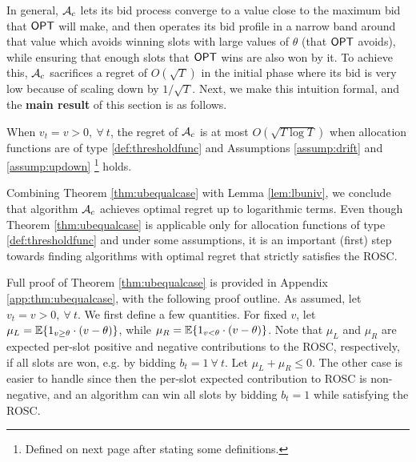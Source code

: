 In general, $\mathcal{A}_c$ lets its bid process converge to a value close to the maximum bid that $\mathsf{OPT}$ will make, and then operates its bid profile in a narrow band around that value which avoids winning slots with large values of $\theta$ (that $\mathsf{OPT}$ avoids), while ensuring that enough slots that $\mathsf{OPT}$ wins are also won by it. To achieve this, $\mathcal{A}_c$ sacrifices a regret of $O(\sqrt{T})$ in the initial phase where its bid is very low because of scaling down by $1/\sqrt{T}$.
Next, we make this intuition formal, and the {\bf main result} of this section is as follows.

\begin{theorem}\label{thm:ubequalcase}
 When $v_t=v >0, \ \forall \ t$, the regret of $\mathcal{A}_c$ is at most $O(\sqrt{T \log T})$ when allocation functions are of type \eqref{def:thresholdfunc} and Assumptions \ref{assump:drift} and \ref{assump:updown} \footnote{Defined on next page after stating some definitions.} holds.
\end{theorem}
Combining Theorem \ref{thm:ubequalcase} with  Lemma \ref{lem:lbuniv}, we conclude that algorithm $\mathcal{A}_c$ achieves optimal regret up to logarithmic terms. Even though Theorem \ref{thm:ubequalcase} is applicable only for allocation functions of type \eqref{def:thresholdfunc} and under some assumptions, it is an important (first) step towards finding algorithms with optimal regret that strictly satisfies the ROSC.

Full proof of Theorem \ref{thm:ubequalcase} is provided in Appendix \ref{app:thm:ubequalcase}, with the following proof outline.
As assumed, let $v_t=v>0, \ \forall \ t$. 
  We first define a few quantities.
 For fixed $v$, let  $\mu_L = {\mathbb{E}}\{1_{v \ge \theta} \cdot(v-\theta)\}$, while $\mu_R = {\mathbb{E}}\{1_{v< \theta}\cdot (v-\theta)\}$. Note that $\mu_L$ and $\mu_R$ 
 are expected per-slot positive and negative contributions to the ROSC, respectively, if all slots are won, e.g. by bidding $b_t=1 \ \forall \ t$.
 Let $\mu_L + \mu_R \le 0$. The other case is easier to handle since then the per-slot expected contribution to ROSC is non-negative, and an algorithm can win all slots by bidding $b_t=1$ while 
satisfying the ROSC.
 
